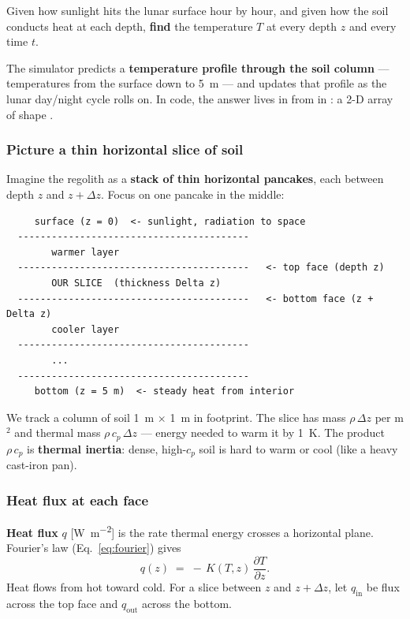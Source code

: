 \begin{keyidea}
Given how sunlight hits the lunar surface hour by hour, and given how the soil
conducts heat at each depth, \textbf{find} the temperature $T$ at every depth
$z$ and every time $t$.
\end{keyidea}

The simulator predicts a \textbf{temperature profile through the soil column}
--- temperatures from the surface down to \SI{5}{m} --- and updates that
profile as the lunar day/night cycle rolls on. In code, the answer lives in
 from  in : a
2-D array of shape .

\subsubsection{Picture a thin horizontal slice of soil}

Imagine the regolith as a \textbf{stack of thin horizontal pancakes}, each
between depth $z$ and $z+\Delta z$. Focus on one pancake in the middle:

\begin{verbatim}
     surface (z = 0)  <- sunlight, radiation to space
  -----------------------------------------
        warmer layer
  -----------------------------------------   <- top face (depth z)
        OUR SLICE  (thickness Delta z)
  -----------------------------------------   <- bottom face (z + Delta z)
        cooler layer
  -----------------------------------------
        ...
  -----------------------------------------
     bottom (z = 5 m)  <- steady heat from interior
\end{verbatim}

We track a column of soil \SI{1}{m} $\times$ \SI{1}{m} in footprint. The
slice has mass $\rho\,\Delta z$ per m$^2$ and thermal mass $\rho\,c_p\,\Delta z$
--- energy needed to warm it by \SI{1}{\kelvin}. The product $\rho\,c_p$ is
\textbf{thermal inertia}: dense, high-$c_p$ soil is hard to warm or cool (like a
heavy cast-iron pan).

\subsubsection{Heat flux at each face}

\textbf{Heat flux} $q$ [\unit{W.m^{-2}}] is the rate thermal energy crosses a
horizontal plane. Fourier's law (Eq.~\eqref{eq:fourier}) gives
\begin{equation}
  q(z) \;=\; -\,K(T,z)\,\frac{\partial T}{\partial z}.
\end{equation}
Heat flows from hot toward cold. For a slice between $z$ and $z+\Delta z$,
let $q_\mathrm{in}$ be flux across the top face and $q_\mathrm{out}$ across the
bottom.

